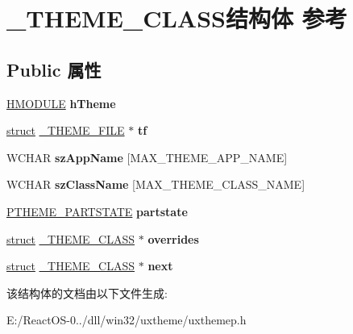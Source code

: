 \hypertarget{struct___t_h_e_m_e___c_l_a_s_s}{}\section{\+\_\+\+T\+H\+E\+M\+E\+\_\+\+C\+L\+A\+S\+S结构体 参考}
\label{struct___t_h_e_m_e___c_l_a_s_s}
\subsection*{Public 属性}
\begin{DoxyCompactItemize}
\item 
\mbox{\label{struct___t_h_e_m_e___c_l_a_s_s_a3210efa1126baf5b95ccee8b205ede63}} 
\hyperlink{interfacevoid}{H\+M\+O\+D\+U\+LE} {\bfseries h\+Theme}
\item 
\mbox{\label{struct___t_h_e_m_e___c_l_a_s_s_a5f35af0057b9c99172e4612df8c72a8b}} 
\hyperlink{interfacestruct}{struct} \hyperlink{struct___t_h_e_m_e___f_i_l_e}{\+\_\+\+T\+H\+E\+M\+E\+\_\+\+F\+I\+LE} $\ast$ {\bfseries tf}
\item 
\mbox{\label{struct___t_h_e_m_e___c_l_a_s_s_abdf1e04a3c7a5ffc1dd15e9d42a00938}} 
W\+C\+H\+AR {\bfseries sz\+App\+Name} \mbox{[}M\+A\+X\+\_\+\+T\+H\+E\+M\+E\+\_\+\+A\+P\+P\+\_\+\+N\+A\+ME\mbox{]}
\item 
\mbox{\label{struct___t_h_e_m_e___c_l_a_s_s_af685b94b59ee98509580f24e93e2205a}} 
W\+C\+H\+AR {\bfseries sz\+Class\+Name} \mbox{[}M\+A\+X\+\_\+\+T\+H\+E\+M\+E\+\_\+\+C\+L\+A\+S\+S\+\_\+\+N\+A\+ME\mbox{]}
\item 
\mbox{\label{struct___t_h_e_m_e___c_l_a_s_s_ac18c863dfb29ea80293aee5a6f2041a2}} 
\hyperlink{struct___t_h_e_m_e___p_a_r_t_s_t_a_t_e}{P\+T\+H\+E\+M\+E\+\_\+\+P\+A\+R\+T\+S\+T\+A\+TE} {\bfseries partstate}
\item 
\mbox{\label{struct___t_h_e_m_e___c_l_a_s_s_a7437e192904b8d0023298d33ee854fdc}} 
\hyperlink{interfacestruct}{struct} \hyperlink{struct___t_h_e_m_e___c_l_a_s_s}{\+\_\+\+T\+H\+E\+M\+E\+\_\+\+C\+L\+A\+SS} $\ast$ {\bfseries overrides}
\item 
\mbox{\label{struct___t_h_e_m_e___c_l_a_s_s_aed3086c80ebc29c4a6133f4c0e7d79a9}} 
\hyperlink{interfacestruct}{struct} \hyperlink{struct___t_h_e_m_e___c_l_a_s_s}{\+\_\+\+T\+H\+E\+M\+E\+\_\+\+C\+L\+A\+SS} $\ast$ {\bfseries next}
\end{DoxyCompactItemize}


该结构体的文档由以下文件生成\+:\begin{DoxyCompactItemize}
\item 
E\+:/\+React\+O\+S-\/0../dll/win32/uxtheme/uxthemep.\+h\end{DoxyCompactItemize}
